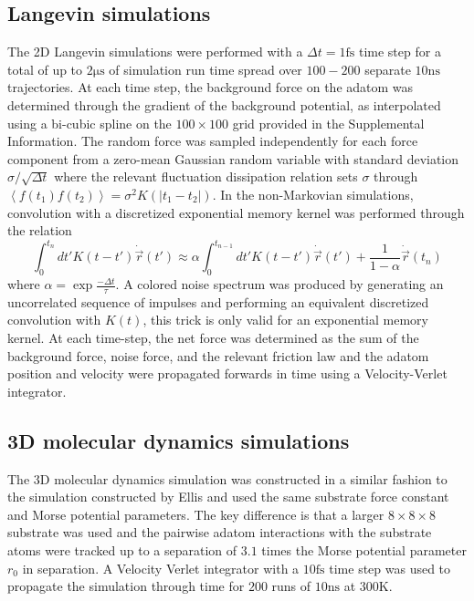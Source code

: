 \documentclass[7pt]{article}
\newcommand{\ns}{\si{\nano\second}}
\newcommand{\fs}{\si{\femto\second}}
\newcommand{\us}{\si{\micro\second}}
\newcommand{\K}{\si{\kelvin}}
\begin{document}
\subsection*{Langevin simulations}

The 2D Langevin simulations were performed with a $\Delta{t} = 1\fs$ time step for a total of up to $2\us$ of simulation run time spread over $100-200$ separate $10\ns$ trajectories. At each time step, the background force on the adatom was determined through the gradient of the background potential, as interpolated using a bi-cubic spline on the $100\times100$ grid provided in the Supplemental Information. The random force was sampled independently for each force component from a zero-mean Gaussian random variable with standard deviation $\sigma/\sqrt{\Delta{t}}$ where the relevant fluctuation dissipation relation sets $\sigma$ through $\left<f\left(t_1\right)f\left(t_2\right)\right>=\sigma^2K\left(|t_1-t_2|\right)$. In the non-Markovian simulations, convolution with a discretized exponential memory kernel was performed through the relation
\begin{equation}
	\int_0^{t_n} dt' K\left(t-t'\right) \dot{\vec{r}}(t') \approx \alpha \int_0^{t_{n-1}} dt' K\left(t-t'\right) \dot{\vec{r}}(t') + \frac{1}{1-\alpha} \dot{\vec{r}}\left(t_n\right)
\end{equation}
where $\alpha = \exp{\frac{-\Delta{t}}{\tau}}$. A colored noise spectrum was produced by generating an uncorrelated sequence of impulses and performing an equivalent discretized convolution with $K(t)$, this trick is only valid for an exponential memory kernel. At each time-step, the net force was determined as the sum of the background force, noise force, and the relevant friction law and the adatom position and velocity were propagated forwards in time using a Velocity-Verlet integrator\cite{Verlet}.

\subsection*{3D molecular dynamics simulations}

The 3D molecular dynamics simulation was constructed in a similar fashion to the simulation constructed by Ellis\cite{Ellis} and used the same substrate force constant and Morse potential parameters. The key difference is that a larger $8\times8\times8$ substrate was used and the pairwise adatom interactions with the substrate atoms were tracked up to a separation of $3.1$ times the Morse potential parameter $r_0$ in separation. A Velocity Verlet integrator\cite{Verlet} with a $10\fs$ time step was used to propagate the simulation through time for $200$ runs of $10\ns$ at $300\K$.
\end{document}
